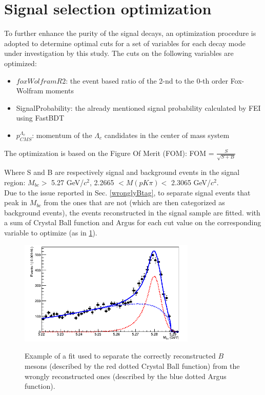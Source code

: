 \section{Signal selection optimization}

To further enhance the purity of the signal decays, an optimization procedure is adopted to determine optimal cuts for a set of variables for each decay mode under investigation by this study.
The cuts on the following variables are optimized:
\begin{itemize}
    \item $foxWolframR2$: the event based ratio
of the 2-nd to the 0-th order Fox-Wolfram moments
    \item SignalProbability: the already mentioned signal probability calculated by FEI using FastBDT
    \item $p^{\Lambda_c}_{CMS}$: momentum of the $\Lambda_c$ candidates in the center of mass system
\end{itemize}

The optimization is based on the Figure Of Merit (FOM): FOM = $\frac{S}{\sqrt{S+B}}$

Where S and B are respectively signal and background events in the signal region: $M_{bc} > $ 5.27 GeV/$c^2$,  2.2665  $< M(p K \pi) <$ 2.3065 GeV/$c^2$.\\
Due to the issue reported in Sec. \ref{wronglyBtag}, to separate signal events that peak in $M_{bc}$ from the ones that are not (which are then categorized as background events), the events reconstructed in the signal sample are fitted. with a sum of Crystal Ball function and Argus for each cut value on the corresponding variable to optimize (as in \cref{fig:wrongB_Mbc}).

\begin{figure}[h!]
{\includegraphics[width=0.75\textwidth]{03-Selection/figs/wrongB_Mbc.png}}
\caption{Example of a fit used to separate the correctly reconstructed $B$ mesons (described by the red dotted Crystal Ball function) from the wrongly reconstructed ones (described by the blue dotted Argus function).}
\label{fig:wrongB_Mbc}
\end{figure}

